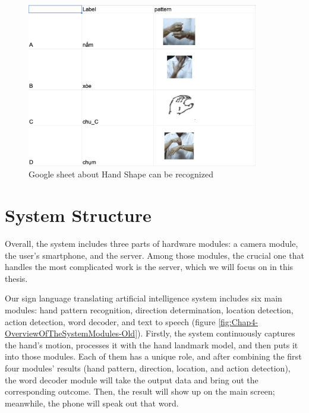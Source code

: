 \begin{figure}[H]
	\centering
	\includegraphics[width=0.9\textwidth]{img/Chap4/Sheet-Pattern.png}
	\caption{Google sheet about Hand Shape can be recognized}
	\label{fig:Chap4-Sheet-Pattern}
\end{figure}



\section{System Structure}

Overall, the system includes three parts of hardware modules: a camera module, the user's smartphone, and the server. Among those modules, the crucial one that handles the most complicated work is the server, which we will focus on in this thesis.

Our sign language translating artificial intelligence system includes six main modules: hand pattern recognition, direction determination, location detection, action detection, word decoder, and text to speech (figure \ref{fig:Chap4-OverviewOfTheSystemModules-Old}). Firstly, the system continuously captures the hand's motion, processes it with the hand landmark model, and then puts it into those modules. Each of them has a unique role, and after combining the first four modules' results (hand pattern, direction, location, and action detection), the word decoder module will take the output data and bring out the corresponding outcome. Then, the result will show up on the main screen; meanwhile, the phone will speak out that word.

